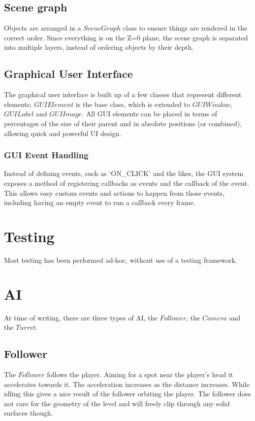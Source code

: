 \documentclass[english]{article}
\begin{document}
\subsection{Scene graph}
Objects are arranged in a $SceneGraph$ class to ensure things are rendered in the correct order. Since everything is on the Z=0 plane, the scene graph is separated into multiple layers, instead of ordering objects by their depth.

\subsection{Graphical User Interface}
The graphical user interface is built up of a few classes that represent different elements; $GUIElement$ is the base class, which is extended to $GUIWindow$, $GUILabel$ and $GUIImage$. All GUI elements can be placed in terms of percentages of the size of their parent and in absolute positions (or combined), allowing quick and powerful UI design.

\subsubsection{GUI Event Handling}
Instead of defining events, such as `ON\_CLICK' and the likes, the GUI system exposes a method of registering callbacks as events and the callback of the event. This allows easy custom events and actions to happen from those events, including having an empty event to run a callback every frame.

\section{Testing}
Most testing has been performed ad-hoc, without use of a testing framework.

\section{AI}
At time of writing, there are three types of AI, the $Follower$, the $Camera$ and the $Turret$.
\subsection{Follower}
The $Follower$ follows the player. Aiming for a spot near the player's head it accelerates towards it. The acceleration increases as the distance increases. While idling this gives a nice result of the follower orbiting the player. The follower does not care for the geometry of the level and will freely clip through any solid surfaces though.
\end{document}
